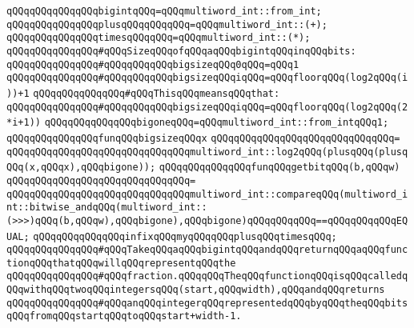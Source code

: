 \newline
\verb|qQQqqQQqqQQqqQQqbigintqQQq=qQQqmultiword_int::from_int;|\newline
\verb|qQQqqQQqqQQqqQQqplusqQQqqQQqqQQq=qQQqmultiword_int::(+);|\newline
\verb|qQQqqQQqqQQqqQQqtimesqQQqqQQq=qQQqmultiword_int::(*);|\newline
\newline
\verb|qQQqqQQqqQQqqQQq#qQQqSizeqQQqofqQQqaqQQqbigintqQQqinqQQqbits:|\newline
\verb|qQQqqQQqqQQqqQQq#qQQqqQQqqQQqbigsizeqQQq0qQQq=qQQq1|\newline
\verb|qQQqqQQqqQQqqQQq#qQQqqQQqqQQqbigsizeqQQqiqQQq=qQQqfloorqQQq(log2qQQq(i))+1|\newline
\verb|qQQqqQQqqQQqqQQq#qQQqThisqQQqmeansqQQqthat:|\newline
\verb|qQQqqQQqqQQqqQQq#qQQqqQQqqQQqbigsizeqQQqiqQQq=qQQqfloorqQQq(log2qQQq(2*i+1))|\newline
\newline
\verb|qQQqqQQqqQQqqQQqbigoneqQQq=qQQqmultiword_int::from_intqQQq1;|\newline
\newline
\verb|qQQqqQQqqQQqqQQqfunqQQqbigsizeqQQqx|\newline
\verb|qQQqqQQqqQQqqQQqqQQqqQQqqQQqqQQq=|\newline
\verb|qQQqqQQqqQQqqQQqqQQqqQQqqQQqqQQqmultiword_int::log2qQQq(plusqQQq(plusqQQq(x,qQQqx),qQQqbigone));|\newline
\newline
\verb|qQQqqQQqqQQqqQQqfunqQQqgetbitqQQq(b,qQQqw)|\newline
\verb|qQQqqQQqqQQqqQQqqQQqqQQqqQQqqQQq=|\newline
\verb|qQQqqQQqqQQqqQQqqQQqqQQqqQQqqQQqmultiword_int::compareqQQq(multiword_int::bitwise_andqQQq(multiword_int::(>>>)qQQq(b,qQQqw),qQQqbigone),qQQqbigone)qQQqqQQqqQQq==qQQqqQQqqQQqEQUAL;|\newline
\newline
\verb|qQQqqQQqqQQqqQQqinfixqQQqmyqQQqqQQqplusqQQqtimesqQQq;|\newline
\newline
\verb|qQQqqQQqqQQqqQQq#qQQqTakeqQQqaqQQqbigintqQQqandqQQqreturnqQQqaqQQqfunctionqQQqthatqQQqwillqQQqrepresentqQQqthe|\newline
\verb|qQQqqQQqqQQqqQQq#qQQqfraction.qQQqqQQqTheqQQqfunctionqQQqisqQQqcalledqQQqwithqQQqtwoqQQqintegersqQQq(start,qQQqwidth),qQQqandqQQqreturns|\newline
\verb|qQQqqQQqqQQqqQQq#qQQqanqQQqintegerqQQqrepresentedqQQqbyqQQqtheqQQqbitsqQQqfromqQQqstartqQQqtoqQQqstart+width-1.|\newline
